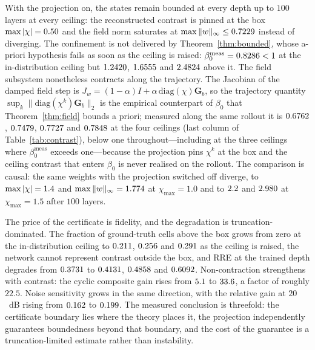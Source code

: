 \documentclass[journal,cmes,article,submit,moreauthors,pdftex]{Definitions/tsp}
\newcommand{\norm}[1]{\lVert #1 \rVert}
\newcommand{\numv}[1]{#1}
\begin{document}
With the projection on, the states remain bounded at every depth up to $100$ layers at every
ceiling: the reconstructed contrast is pinned at the box $\max|\chi|=\numv{\NumMaxChiBox}$ and
the field norm saturates at $\max\|w\|_\infty\le\numv{\NumMaxWOneFive}$ instead of diverging. The
confinement is not delivered by Theorem~\ref{thm:bounded}, whose a-priori hypothesis fails as soon
as the ceiling is raised: $\beta_0^{\mathrm{meas}}=\numv{\NumBetaZeroFive}<1$ at the
in-distribution ceiling but $\numv{\NumBetaSevenFive}$, $\numv{\NumBetaOneZero}$ and
$\numv{\NumBetaOneFive}$ above it. The field subsystem nonetheless contracts along the trajectory.
The Jacobian of the damped field step is $J_w=(1-\alpha)I+\alpha\,\mathrm{diag}(\chi)\mathbf G_b$,
so the trajectory quantity $\sup_k\norm{\mathrm{diag}(\chi^k)\mathbf G_b}_2$ is the empirical
counterpart of $\beta_0$ that Theorem~\ref{thm:field} bounds a priori; measured along the same
rollout it is $\numv{\NumFieldSubCertZeroFive}$, $\numv{\NumFieldSubCertSevenFive}$,
$\numv{\NumFieldSubCertOneZero}$ and $\numv{\NumFieldSubCertOneFive}$ at the four ceilings (last
column of Table~\ref{tab:contrast}), below one throughout---including at the three ceilings where
$\beta_0^{\mathrm{meas}}$ exceeds one---because the projection pins $\chi^k$ at the box and the
ceiling contrast that enters $\beta_0$ is never realised on the rollout. The comparison is causal:
the same weights with the projection switched off diverge, to $\max|\chi|=\numv{\NumProjOffChiOneZero}$ and
$\max\|w\|_\infty=\numv{\NumProjOffWOneZero}$ at $\chi_{\max}=1.0$ and to
$\numv{\NumProjOffChiOneFive}$ and $\numv{\NumProjOffWOneFive}$ at $\chi_{\max}=1.5$ after $100$ layers.

The price of the certificate is fidelity, and the degradation is truncation-dominated. The
fraction of ground-truth cells above the box grows from zero at the in-distribution ceiling to
$\numv{\NumFracBoxSevenFive}$, $\numv{\NumFracBoxOneZero}$ and $\numv{\NumFracBoxOneFive}$ as the ceiling is
raised, the network cannot represent contrast outside the box, and RRE at the trained depth
degrades from $\numv{\NumRreZeroFive}$ to $\numv{\NumRreSevenFive}$, $\numv{\NumRreOneZero}$ and
$\numv{\NumRreOneFive}$. Non-contraction strengthens with contrast: the cyclic composite gain rises
from $\numv{\NumCycGainZeroFive}$ to $\numv{\NumCycGainOneFive}$, a factor of roughly $22.5$. Noise
sensitivity grows in the same direction, with the relative gain at $20$~dB rising from
$\numv{\NumSensZeroFive}$ to $\numv{\NumSensOneFive}$. The measured conclusion is threefold: the
certificate boundary lies where the theory places it, the projection independently guarantees
boundedness beyond that boundary, and the cost of the guarantee is a truncation-limited estimate
rather than instability.
\end{document}
